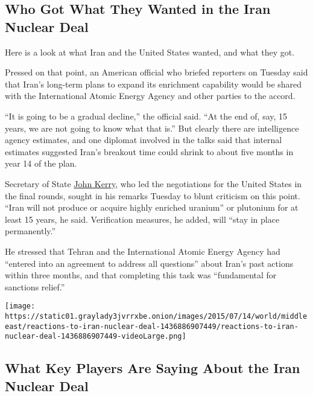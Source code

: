 \hypertarget{who-got-what-they-wanted-in-the-iran-nuclear-deal}{%
\subsection{Who Got What They Wanted in the Iran Nuclear
Deal}\label{who-got-what-they-wanted-in-the-iran-nuclear-deal}}

Here is a look at what Iran and the United States wanted, and what they
got.

Pressed on that point, an American official who briefed reporters on
Tuesday said that Iran's long-term plans to expand its enrichment
capability would be shared with the International Atomic Energy Agency
and other parties to the accord.

``It is going to be a gradual decline,'' the official said. ``At the end
of, say, 15 years, we are not going to know what that is.'' But clearly
there are intelligence agency estimates, and one diplomat involved in
the talks said that internal estimates suggested Iran's breakout time
could shrink to about five months in year 14 of the plan.

Secretary of State
\href{http://topics.nytimes3xbfgragh.onion/top/reference/timestopics/people/k/john_kerry/index.html?inline=nyt-per}{John
Kerry}, who led the negotiations for the United States in the final
rounds, sought in his remarks Tuesday to blunt criticism on this point.
``Iran will not produce or acquire highly enriched uranium'' or
plutonium for at least 15 years, he said. Verification measures, he
added, will ``stay in place permanently.''

He stressed that Tehran and the International Atomic Energy Agency had
``entered into an agreement to address all questions'' about Iran's past
actions within three months, and that completing this task was
``fundamental for sanctions relief.''

\href{https://www.nytimes3xbfgragh.onion/interactive/2015/07/14/world/middleeast/reactions-to-iran-nuclear-deal.html}{}

\texttt{[image: https://static01.graylady3jvrrxbe.onion/images/2015/07/14/world/middleeast/reactions-to-iran-nuclear-deal-1436886907449/reactions-to-iran-nuclear-deal-1436886907449-videoLarge.png]}

\hypertarget{what-key-players-are-saying-about-the-iran-nuclear-deal}{%
\subsection{What Key Players Are Saying About the Iran Nuclear
Deal}\label{what-key-players-are-saying-about-the-iran-nuclear-deal}}

